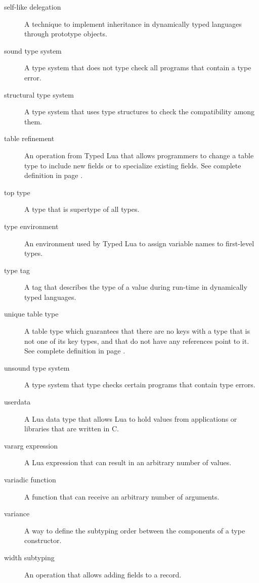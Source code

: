 \begin{description}
\item[self-like delegation] A technique to implement inheritance in dynamically typed
languages through prototype objects.

\item[sound type system] A type system that does not type check all programs that contain a type error.

\item[structural type system] A type system that uses type structures to check the compatibility among them.

\item[table refinement] An operation from Typed Lua that allows programmers to change a table type
to include new fields or to specialize existing fields.
See complete definition in page \pageref{sec:refinement}.

\item[top type] A type that is supertype of all types.

\item[type environment] An environment used by Typed Lua to assign variable names to first-level types.

\item[type tag] A tag that describes the type of a value during run-time in dynamically
typed languages.

\item[unique table type] A table type which guarantees that there are no
keys with a type that is not one of its key types, and that do not have
any references point to it.
See complete definition in page \pageref{def:tabletype}.

\item[unsound type system] A type system that type checks certain programs that contain type errors.

\item[userdata] A Lua data type that allows Lua to hold values from applications
or libraries that are written in C.

\item[vararg expression] A Lua expression that can result in an arbitrary number of values.

\item[variadic function] A function that can receive an arbitrary number of arguments.

\item[variance] A way to define the subtyping order between the components
of a type constructor.

\item[width subtyping] An operation that allows adding fields to a record.

\end{description}
